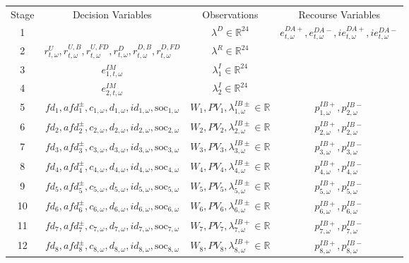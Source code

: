 \documentclass{article}
\newcommand{\R}{\mathbb{R}}
\newcommand{\soc}{\text{soc}}
\begin{document}
\begin{table}
\begin{tabular}{c c c c}
	Stage & Decision Variables & Observations & Recourse Variables \\
	1 & & $\lambda^D \in \R^{24}$ & $e^{DA+}_{t, \omega}, e^{DA-}_{t, \omega}, ie^{DA+}_{t, \omega}, ie^{DA-}_{t, \omega}$\\
	2 & $r^U_{t, \omega}, r^{U, B}_{t, \omega}, r^{U, FD}_{t, \omega}, r^{D}_{t, \omega}, r^{D, B}_{t, \omega}, r^{D, FD}_{t, \omega}$ & $\lambda^R \in \R^{24}$ & \\
	3 & $e^{IM}_{1, t, \omega}$ & $\lambda^I_1 \in \R^{24}$ &  \\
	4 & $e^{IM}_{2, t, \omega}$ & $\lambda^I_2 \in \R^{24}$ &  \\
	5 & $fd_1, afd^{\pm}_1, c_{1, \omega}, d_{1, \omega}, id_{1, \omega}, \soc_{1, \omega}$ & $W_1, PV_1, \lambda^{IB\pm}_{1, \omega} \in \R$ & $p^{IB+}_{1, \omega}, p^{IB-}_{2, \omega}$  \\
	6 & $fd_2, afd^{\pm}_2, c_{2, \omega}, d_{2, \omega}, id_{2, \omega}, \soc_{2, \omega}$ & $W_2, PV_2, \lambda^{IB\pm}_{2, \omega} \in \R$ & $p^{IB+}_{2, \omega}, p^{IB-}_{2, \omega}$ \\
	7 & $fd_3, afd^{\pm}_3, c_{3, \omega}, d_{3, \omega}, id_{3, \omega}, \soc_{3, \omega}$  & $W_3, PV_3, \lambda^{IB\pm}_{3, \omega} \in \R$ & $p^{IB+}_{3, \omega}, p^{IB-}_{3, \omega}$ \\
	8 & $fd_4, afd^{\pm}_4, c_{4, \omega}, d_{4, \omega}, id_{4, \omega}, \soc_{4, \omega}$ & $W_4, PV_4, \lambda^{IB\pm}_{4, \omega} \in \R$ & $p^{IB+}_{4, \omega}, p^{IB-}_{4, \omega}$ \\
	9 & $fd_5, afd^{\pm}_5, c_{5, \omega}, d_{5, \omega}, id_{5, \omega}, \soc_{5, \omega}$ & $W_5, PV_5, \lambda^{IB\pm}_{5, \omega} \in \R$ & $p^{IB+}_{5, \omega}, p^{IB-}_{5, \omega}$\\
	10 & $fd_6, afd^{\pm}_6, c_{6, \omega}, d_{6, \omega}, id_{6, \omega}, \soc_{6, \omega}$ & $W_6, PV_6, \lambda^{IB\pm}_{6, \omega} \in \R$ & $p^{IB+}_{6, \omega}, p^{IB-}_{6, \omega}$ \\
	11 & $fd_7, afd^{\pm}_7, c_{7, \omega}, d_{7, \omega}, id_{7, \omega}, \soc_{7, \omega}$ & $W_7, PV_7, \lambda^{IB+}_{7, \omega} \in \R$ & $p^{IB+}_{7, \omega}, p^{IB-}_{7, \omega}$ \\
	12 & $fd_8, afd^{\pm}_8, c_{8, \omega}, d_{8, \omega}, id_{8, \omega}, \soc_{8, \omega}$ & $W_8, PV_8, \lambda^{IB+}_{8, \omega} \in \R$ & $p^{IB+}_{8, \omega}, p^{IB-}_{8, \omega}$ \\

\end{tabular}
\end{table}
\end{document}
